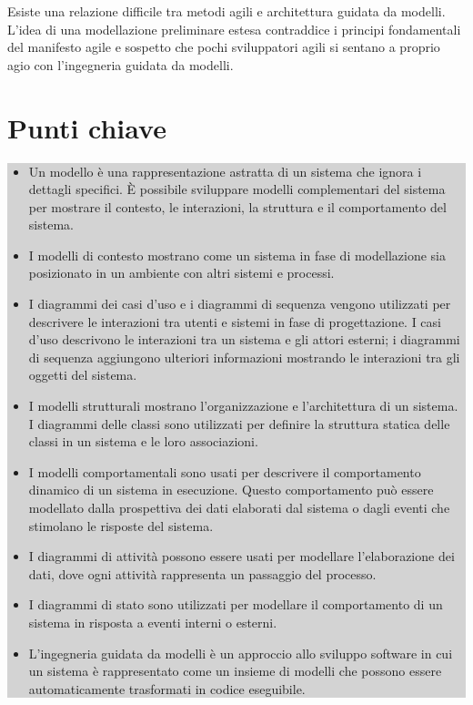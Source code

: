 Esiste una relazione difficile tra metodi agili e architettura guidata da modelli. L'idea di una modellazione preliminare estesa contraddice i principi fondamentali del manifesto agile e sospetto che pochi sviluppatori agili si sentano a proprio agio con l'ingegneria guidata da modelli.

\newpage
\section{Punti chiave}
\begin{center}
\begin{minipage}{\textwidth}
\colorbox{lightgray}{
\parbox{\linewidth}{
\begin{itemize} 
    \item Un modello è una rappresentazione astratta di un sistema che ignora i dettagli specifici. È possibile sviluppare modelli complementari del sistema per mostrare il contesto, le interazioni, la struttura e il comportamento del sistema.
    \item I modelli di contesto mostrano come un sistema in fase di modellazione sia posizionato in un ambiente con altri sistemi e processi.
    \item I diagrammi dei casi d’uso e i diagrammi di sequenza vengono utilizzati per descrivere le interazioni tra utenti e sistemi in fase di progettazione. I casi d'uso descrivono le interazioni tra un sistema e gli attori esterni; i diagrammi di sequenza aggiungono ulteriori informazioni mostrando le interazioni tra gli oggetti del sistema.
    \item I modelli strutturali mostrano l’organizzazione e l’architettura di un sistema. I diagrammi delle classi sono utilizzati per definire la struttura statica delle classi in un sistema e le loro associazioni.
    \item I modelli comportamentali sono usati per descrivere il comportamento dinamico di un sistema in esecuzione. Questo comportamento può essere modellato dalla prospettiva dei dati elaborati dal sistema o dagli eventi che stimolano le risposte del sistema.
    \item I diagrammi di attività possono essere usati per modellare l'elaborazione dei dati, dove ogni attività rappresenta un passaggio del processo.
    \item I diagrammi di stato sono utilizzati per modellare il comportamento di un sistema in risposta a eventi interni o esterni.
    \item L'ingegneria guidata da modelli è un approccio allo sviluppo software in cui un sistema è rappresentato come un insieme di modelli che possono essere automaticamente trasformati in codice eseguibile.
\end{itemize}
}}
\end{minipage}
\end{center}